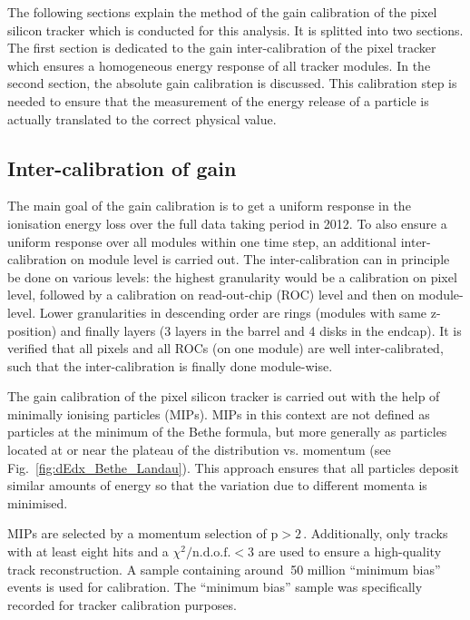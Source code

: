 The following sections explain the method of the gain calibration of the pixel silicon tracker which is conducted for this analysis. 
It is splitted into two sections. 
The first section is dedicated to the gain inter-calibration of the pixel tracker which ensures a homogeneous energy response of all tracker modules.
In the second section, the absolute gain calibration is discussed. 
This calibration step is needed to ensure that the measurement of the energy release of a particle is actually translated to the correct physical value.



\subsection*{Inter-calibration of gain}
The main goal of the gain calibration is to get a uniform response in the ionisation energy loss \dedx over the full data taking period in 2012.
To also ensure a uniform response over all modules within one time step, an additional inter-calibration on module level is carried out.
The inter-calibration can in principle be done on various levels: the highest granularity would be a calibration on pixel level, followed by a calibration on read-out-chip (ROC) level and then on module-level.
Lower granularities in descending order are rings (modules with same z-position) and finally layers (3 layers in the barrel and 4 disks in the endcap). 
It is verified that all pixels and all ROCs (on one module) are well inter-calibrated, such that the inter-calibration is finally done module-wise.


The gain calibration of the pixel silicon tracker is carried out with the help of minimally ionising particles (MIPs).
MIPs in this context are not defined as particles at the minimum of the Bethe formula, but more generally as particles located at or near the plateau of the \dedx distribution vs. momentum (see Fig.~\ref{fig:dEdx_Bethe_Landau}).
This approach ensures that all particles deposit similar amounts of energy so that the variation due to different momenta is minimised.

MIPs are selected by a momentum selection of $\text{p}>2\,$\gev.
Additionally, only tracks with at least eight hits and a $\chi^2/\text{n.d.o.f.}<3$ are used to ensure a high-quality track reconstruction.
A sample containing around $~$50 million ``minimum bias'' events is used for calibration.
The ``minimum bias'' sample was specifically recorded for tracker calibration purposes.

